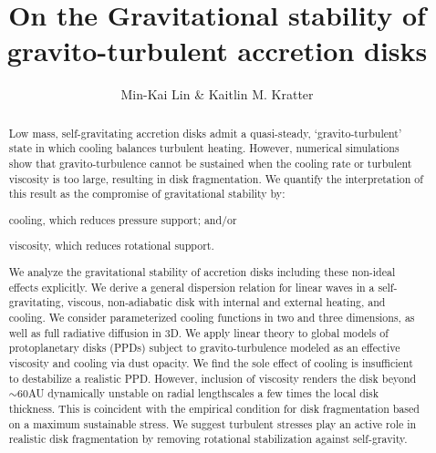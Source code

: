 \documentclass[iop, numberedappendix]{emulateapj}
\begin{document}
\title{On the Gravitational stability of gravito-turbulent accretion disks}
\author{Min-Kai Lin \& Kaitlin M. Kratter}

\begin{abstract}
Low mass, self-gravitating accretion disks admit a quasi-steady,
`gravito-turbulent' state in which cooling balances turbulent
heating. However, numerical simulations show that gravito-turbulence
cannot be sustained when the cooling rate or  
turbulent viscosity is too large, resulting in disk fragmentation.     
We quantify the interpretation of this result as the
compromise of gravitational stability by: 
\begin{inparaenum}[1)] 
\item 
cooling, which reduces pressure support; and/or
\item 
viscosity, which reduces rotational support. 
\end{inparaenum}
We analyze the gravitational stability of accretion disks 
including these non-ideal effects explicitly.    
We derive a general dispersion relation for linear waves in a 
self-gravitating, viscous, non-adiabatic disk with internal and
external heating, and cooling. We 
consider parameterized cooling functions in two and three dimensions,
as well as full radiative diffusion in 3D. 
We apply linear theory to 
global models of protoplanetary disks (PPDs) subject to gravito-turbulence modeled as an effective
viscosity and cooling via dust opacity. We find the sole effect of cooling is insufficient to
destabilize a realistic PPD. However, inclusion of viscosity renders
the disk beyond $\sim 60$AU dynamically unstable on radial 
lengthscales a few times the local disk thickness. This is coincident 
with the empirical condition for disk fragmentation based on a
maximum sustainable stress. 
We suggest turbulent stresses play an active role in realistic disk
fragmentation by removing rotational stabilization against 
self-gravity. 
\end{abstract}
\end{document}
